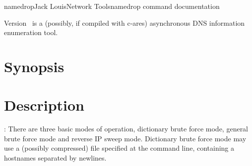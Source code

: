 \documentclass[english]{article}
\begin{document}
\begin{Name}{1}{namedrop}{Jack Louis}{Network Tools}{namedrop command documentation}

 Version \Version\ is a (possibly, if compiled with c-ares) asynchronous DNS information enumeration
tool.

\end{Name}

\section{Synopsis}


\section{Description}

:
	There are three basic modes of operation, dictionary brute force mode, general brute force mode and
reverse IP sweep mode. Dictionary brute force mode may use a (possibly compressed) file specified at the
command line, containing a hostnames separated by newlines.
\end{document}
